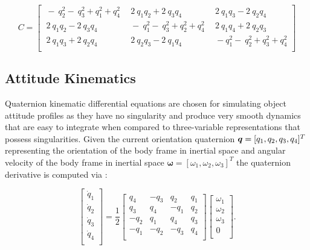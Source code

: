 \begin{equation} \label{eq:quat2dcm}
        C = \left[\begin{matrix}\ -\ q_2^2-\ q_3^2+q_1^2+q_4^2\ &\ 2\ q_1q_2+2\ q_3q_4&\ 2\ q_1q_3-2\ q_2q_4\\\ 2\ q_1q_2-2\ q_3q_4&\ -\ q_1^2-\ q_3^2+q_2^2+q_4^2\ &\ 2\ q_1q_4+2\ q_2q_3\\\ 2\ q_1q_3+2\ q_2q_4&\ 2\ q_2q_3-2\ q_1q_4&\ -q_1^2-\ q_2^2+q_3^2+q_4^2\\\end{matrix}\right]
\end{equation}

\subsection{Attitude Kinematics}

Quaternion kinematic differential equations are chosen for simulating object attitude profiles as they have no singularity and produce very smooth dynamics that are easy to integrate when compared to three-variable representations that possess singularities. Given the current orientation quaternion $\bm{q} = [q_1, q_2, q_3, q_4]^T$ representing the orientation of the body frame in inertial space and angular velocity of the body frame in inertial space $\boldsymbol{\omega} = [\omega_1, \omega_2, \omega_3]^T$ the quaternion derivative is computed via \cite{crassidis1ed}:

\begin{equation} \label{eq:quat_kde}
    \left[\begin{matrix}\dot{q}_1\\\dot{q}_2\\\dot{q}_3\\\dot{q}_4\\\end{matrix}\right]
    =
    \frac{1}{2}\left[\begin{matrix}q_4&-q_3&q_2&q_1\\q_3&q_4&-q_1&q_2\\-q_2&q_1&q_4&q_3\\-q_1&-q_2&-q_3&q_4\\\end{matrix}\right]
    \left[\begin{matrix}\omega_1\\\omega_2\\\omega_3\\0\\\end{matrix}\right].
\end{equation} 


